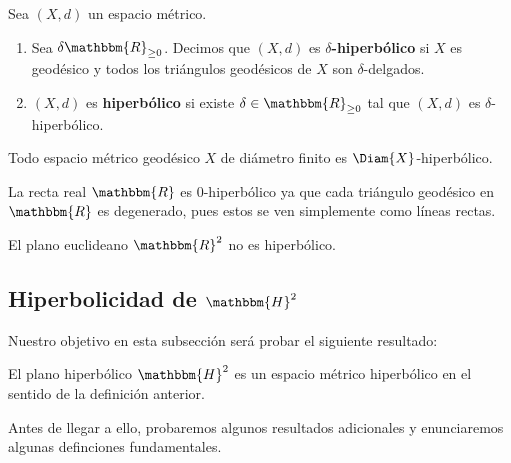 \documentclass[12pt]{report}
\newcounter{it}
\theoremstyle{largebreak}
\newcommand{\bbm}[1]{\ensuremath{\mathbbm{#1}}}
\begin{document}
    \begin{exa}
        
    \end{exa}

    \begin{mydef}
        Sea $(X,d)$ un espacio métrico.
        \begin{enumerate}[label = \textit{(\arabic*)}]
            \item Sea $\delta\bbm{R}_{\geq0}$. Decimos que $(X,d)$ es \textbf{$\delta$-hiperbólico} si $X$ es geodésico y todos los triángulos geodésicos de $X$ son $\delta$-delgados.
            \item $(X,d)$ es \textbf{hiperbólico} si existe $\delta\in\bbm{R}_{\geq0}$ tal que $(X,d)$ es $\delta$-hiperbólico.
        \end{enumerate}
    \end{mydef}

    \begin{exa}
        Todo espacio métrico geodésico $X$ de diámetro finito es $\Diam{X}$-hiperbólico. 
    \end{exa}

    \begin{exa}
        La recta real $\bbm{R}$ es $0$-hiperbólico ya que cada triángulo geodésico en $\bbm{R}$ es degenerado, pues estos se ven simplemente como líneas rectas.
    \end{exa}

    \begin{exa}
        El plano euclideano $\bbm{R}^2$ no es hiperbólico.
    \end{exa}


    \subsection{Hiperbolicidad de $\bbm{H}^2$}

    Nuestro objetivo en esta subsección será probar el siguiente resultado:

    \begin{propo}
        El plano hiperbólico $\bbm{H}^2$ es un espacio métrico hiperbólico en el sentido de la definición anterior.
    \end{propo}

    Antes de llegar a ello, probaremos algunos resultados adicionales y enunciaremos algunas definciones fundamentales.
\end{document}
